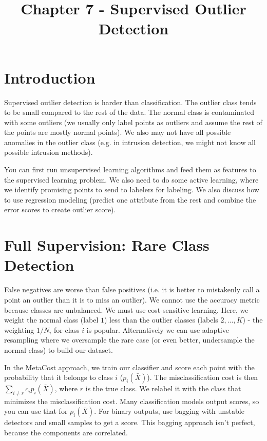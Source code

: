 \documentclass[a4paper]{article}
\title{Chapter 7 - Supervised Outlier Detection}
\date{}
\begin{document}
\maketitle

\section{Introduction}
Supervised outlier detection is harder than classification. The outlier class
tends to be small compared to the rest of the data. The normal class is
contaminated with some outliers (we usually only label points as outliers
and assume the rest of the points are mostly normal points). We also may not
have all possible anomalies in the outlier class (e.g. in intrusion detection,
we might not know all possible intrusion methods).

You can first run unsupervised learning algorithms and feed them as features
to the supervised learning problem. We also need to do some active learning,
where we identify promising points to send to labelers for labeling. We also
discuss how to use regression modeling (predict one attribute from the rest
and combine the error scores to create outlier score).

\section{Full Supervision: Rare Class Detection}
False negatives are worse than false positives (i.e. it is better to mistakenly
call a point an outlier than it is to miss an outlier). We cannot use the
accuracy metric because classes are unbalanced. We must use cost-sensitive
learning. Here, we weight the normal class (label $1$) less than the outlier
classes (labels $2, ..., K$) - the weighting $1/N_i$ for class $i$ is popular.
Alternatively we can use adaptive resampling where we oversample the rare case
(or even better, undersample the normal class) to build our dataset.

In the MetaCost approach, we train our classifier and score each point with
the probability that it belongs to class $i$ ($p_i(\bar{X})$). The
misclassification cost is then $\sum_{i \ne r}{c_i p_i(\bar{X})}$, where $r$
is the true class. We relabel it with the class that minimizes the
misclassification cost. Many classification models output scores, so you can
use that for $p_i(\bar{X})$. For binary outputs, use bagging with
unstable detectors and small samples to get a score.
This bagging approach isn't perfect, because the components are correlated.
\end{document}
